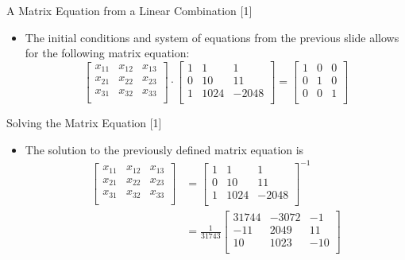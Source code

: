 \documentclass[14pt]{beamer}
\begin{document}
\begin{frame}{A Matrix Equation from a Linear Combination [1]}
 \begin{itemize}
     \item The initial conditions and system of equations from the previous slide allows for the following matrix equation:
        $$
        \begin{bmatrix}
        x_{11} & x_{12} & x_{13} \\
        x_{21} & x_{22} & x_{23} \\
        x_{31} & x_{32} & x_{33} \\
        \end{bmatrix}
        \cdot
        \begin{bmatrix}
        1 & 1 & 1 \\
        0 & 10 & 11 \\
        1 & 1024 & -2048 \\
        \end{bmatrix}
        =
        \begin{bmatrix}
        1 & 0 & 0 \\
        0 & 1 & 0 \\
        0 & 0 & 1 \\
        \end{bmatrix}
        $$
 \end{itemize}
\end{frame}

\begin{frame}{Solving the Matrix Equation [1]}
 \begin{itemize}
     \item The solution to the previously defined matrix equation is
     \begin{align}
    \begin{bmatrix}
     x_{11} & x_{12} & x_{13} \\
     x_{21} & x_{22} & x_{23} \\
     x_{31} & x_{32} & x_{33} \\
    \end{bmatrix}
     &=
    \begin{bmatrix}
     1 & 1 & 1 \\
     0 & 10 & 11 \\
     1 & 1024 & -2048 \\
     \end{bmatrix}^{-1} \\
     &=
     \frac{1}{31743}
     \begin{bmatrix}
     31744 & -3072 & -1 \\
     -11 & 2049 & 11 \\
     10 & 1023 & -10 \\
    \end{bmatrix}
\end{align}
 \end{itemize}
\end{frame}
\end{document}
